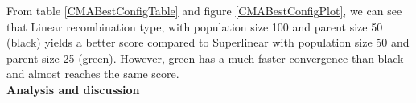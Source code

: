 From table \ref{CMABestConfigTable} and figure \ref{CMABestConfigPlot}, we can see that
Linear recombination type, with population size 100 and parent size 50 (black) yields a 
better score compared to Superlinear with population size 50 and parent size 25 (green).
However, green has a much faster convergence than black and almost reaches the same score.\\


\textbf{Analysis and discussion}\\
\\
\\








